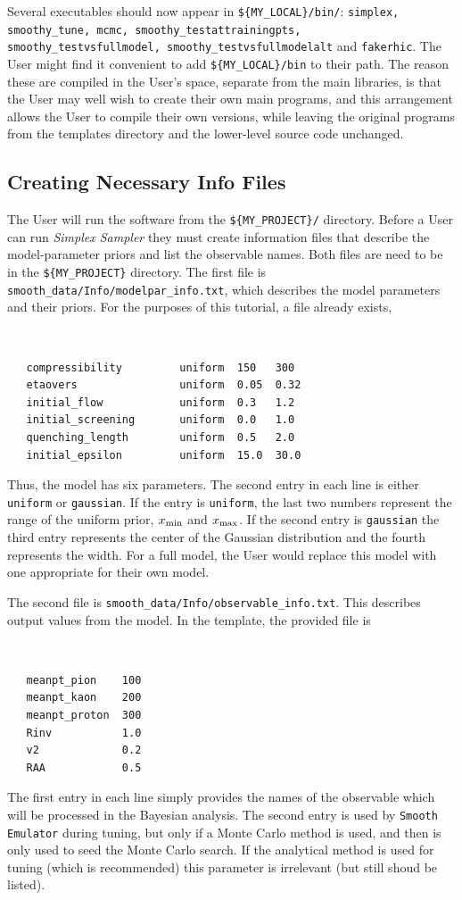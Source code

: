 \documentclass[UserManual.tex]{subfiles}
\begin{document}
Several executables should now appear in {\tt \$\{MY\_LOCAL\}/bin/}: {\tt simplex, smoothy\_tune, mcmc, smoothy\_testattrainingpts, smoothy\_testvsfullmodel, smoothy\_testvsfullmodelalt} and {\tt fakerhic}. The User might find it convenient to add {\tt \$\{MY\_LOCAL\}/bin} to their path. The reason these are compiled in the User's space, separate from the main libraries, is that the User may well wish to create their own main programs, and this arrangement allows the User to compile their own versions, while leaving the original programs from the templates directory and the lower-level source code unchanged. 

\subsection{Creating Necessary Info Files}
The User will run the software from the {\tt \$\{MY\_PROJECT\}/} directory. Before a User can run {\it Simplex Sampler} they must create information files that describe the model-parameter priors and list the observable names. Both files are need to be in the {\tt \$\{MY\_PROJECT\}} directory. The first file is {\tt smooth\_data/Info/modelpar\_info.txt}, which describes the model parameters and their priors. For the purposes of this tutorial, a file already exists,
{\tt
\begin{verbatim}
   compressibility         uniform  150   300
   etaovers                uniform  0.05  0.32
   initial_flow            uniform  0.3   1.2
   initial_screening       uniform  0.0   1.0
   quenching_length        uniform  0.5   2.0
   initial_epsilon         uniform  15.0  30.0
\end{verbatim}
}
Thus, the model has six parameters. The second entry in each line is either {\tt uniform} or {\tt gaussian}. If the entry is {\tt uniform}, the last two numbers represent the range of the uniform prior, $x_{\rm min}$ and $x_{\rm max}$. If the second entry is {\tt gaussian} the third entry represents the center of the Gaussian distribution and the fourth represents the width. For a full model, the User would replace this model with one appropriate for their own model.

The second file is {\tt smooth\_data/Info/observable\_info.txt}. This describes output values from the model. In the template, the provided file is
{\tt
\begin{verbatim}
   meanpt_pion    100      
   meanpt_kaon    200      
   meanpt_proton  300      
   Rinv           1.0      
   v2             0.2     
   RAA            0.5
\end{verbatim}
}
The first entry in each line simply provides the names of the observable which will be processed in the Bayesian analysis.  The second entry is used by {\tt Smooth Emulator} during tuning, but only if a Monte Carlo method is used, and then is only used to seed the Monte Carlo search. If the analytical method is used for tuning (which is recommended) this parameter is irrelevant (but still shoud be listed).
\end{document}

